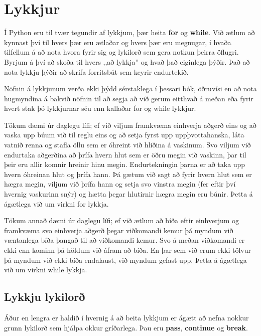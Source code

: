 
\chapter{Lykkjur}\label{k:lykkjur}

Í Python eru til tvær tegundir af lykkjum, þær heita \textbf{for} og \textbf{while}.
Við ætlum að kynnast því til hvers þær eru ætlaðar og hvers þær eru megnugar, í hvaða tilfellum á að nota hvora fyrir sig og lykilorð sem gera notkun þeirra öflugri.
Byrjum á því að skoða til hvers ,,að lykkja'' og hvað það eiginlega þýðir.
Það að nota lykkju þýðir að skrifa forritsbút sem keyrir endurtekið.

Nöfnin á lykkjunum verða ekki þýdd sérstaklega í þessari bók, öðruvísi en að nota hugmyndina á bakvið nöfnin til að segja að við gerum eitthvað á meðan eða fyrir hvert stak þó lykkjurnar séu enn kallaðar for og while lykkjur.

Tökum dæmi úr daglegu lífi; ef við viljum framkvæma einhverja aðgerð eins og að vaska upp búum við til reglu eins og að setja fyrst upp uppþvottahanska, láta vatnið renna og stafla öllu sem er óhreint við hliðina á vaskinum. 
Svo viljum við endurtaka aðgerðina að þrífa hvern hlut sem er öðru megin við vaskinn, þar til þeir eru allir komnir hreinir hinu megin.
Endurtekningin þarna er að taka upp hvern óhreinan hlut og þrífa hann.
Þá gætum við sagt að fyrir hvern hlut sem er hægra megin, viljum við þrífa hann og setja svo vinstra megin (fer eftir því hvernig vaskurinn snýr) og hætta þegar hlutirnir hægra megin eru búnir.
Þetta á ágætlega við um virkni for lykkja.

Tökum annað dæmi úr daglegu lífi; ef við ætlum að bíða eftir einhverjum og framkvæma svo einhverja aðgerð þegar viðkomandi kemur þá myndum við væntanlega bíða þangað til að viðkomandi kemur.
Svo á meðan viðkomandi er ekki enn kominn þá höldum við áfram að bíða.
En þar sem við erum ekki tölvur þá myndum við ekki bíða endalaust, við myndum gefast upp.
Þetta á ágætlega við um virkni while lykkja.

\section{Lykkju lykilorð}
Áður en lengra er haldið í hvernig á að beita lykkjum er ágætt að nefna nokkur grunn lykilorð sem hjálpa okkur gríðarlega.
Þau eru \textbf{pass}, \textbf{continue} og \textbf{break}.

